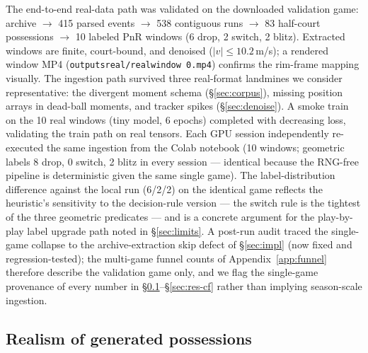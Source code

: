 \documentclass[11pt]{article}
\begin{document}
The end-to-end real-data path was validated on the downloaded validation
game: archive $\rightarrow$ 415 parsed events $\rightarrow$ 538 contiguous
runs $\rightarrow$ 83 half-court possessions $\rightarrow$ 10 labeled PnR
windows (6 drop, 2 switch, 2 blitz). Extracted windows are finite, court-bound,
and denoised ($|v| \le 10.2$\,m/s); a rendered window MP4
(\texttt{outputs\textunderscore real/real\textunderscore window\textunderscore
0.mp4}) confirms the rim-frame mapping visually. The ingestion path survived
three real-format landmines we consider representative: the divergent moment
schema (\S\ref{sec:corpus}), missing position arrays in dead-ball moments,
and tracker spikes (\S\ref{sec:denoise}). A smoke train on the 10 real
windows (tiny model, 6 epochs) completed with decreasing loss, validating the
train path on real tensors. Each GPU session independently re-executed the
same ingestion from the Colab notebook (10 windows; geometric labels 8 drop, 0
switch, 2 blitz in every session --- identical because the RNG-free pipeline
is deterministic given the same single game). The label-distribution
difference against the local run
(6/2/2) on the identical game reflects the heuristic's sensitivity to the
decision-rule version --- the switch rule is the tightest of the three
geometric predicates --- and is a concrete argument for the play-by-play
label upgrade path noted in \S\ref{sec:limits}. A post-run audit traced the
single-game collapse to the archive-extraction skip defect of
\S\ref{sec:impl} (now fixed and regression-tested); the multi-game funnel
counts of Appendix~\ref{app:funnel} therefore describe the validation game
only, and we flag the single-game provenance of every number in
\S\ref{sec:res-realism}--\S\ref{sec:res-cf} rather than implying season-scale
ingestion.

\subsection{Realism of generated possessions}
\label{sec:res-realism}
\end{document}
